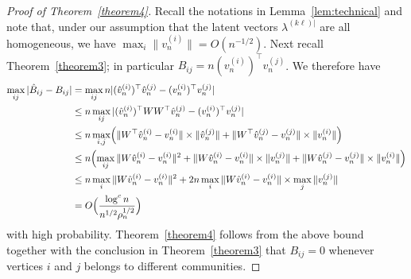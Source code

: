 \documentclass[12pt]{article}
\begin{document}
\begin{proof}[Proof of Theorem~\ref{theorem4}]
  Recall the notations in Lemma~\ref{lem:technical} and note that,
  under our assumption that the latent vectors $\lambda^{(k \ell)|}$
  are all homogeneous, we have $\max_{i} \|v_n^{(i)}\| =
  O(n^{-1/2})$. 
Next recall Theorem~\ref{theorem3}; in particular $B_{ij} = n(v_n^{(i)})^{\top}
v_n^{(j)}$. %
We therefore have
\[\begin{split}
 \max_{ij} |\hat{B}_{ij} - B_{ij}| &= \max_{ij} n |(\hat{v}_n^{(i)})^\top \hat{v}_n^{(j)} -
(v_n^{(i)})^\top v_n^{(j)}| \\
& \leq n \max_{ij} |(\hat{v}_n^{(i)})^\top W W^\top \hat{v}_n^{(j)} -
(v_n^{(i)})^\top v_n^{(j)}| \\
& \leq n \max_{i,j} \Bigl(\|W^{\top} \hat{v}_n^{(i)} - v_n^{(i)}\| \times \|\hat{v}_n^{(j)}\|
+ \|W^{\top} \hat{v}_n^{(j)} - v_n^{(j)}\| \times \|v_n^{(i)}\|\Bigr) \\
& \leq n \Bigl(\max_{ij}  \|W \hat{v}_n^{(i)}  - v_n^{(i)} \|^2 +  \|W
\hat{v}_n^{(i)}  - v_n^{(i)} \| \times \|v_n^{(j)}\| +  \|W \hat{v}_n^{(j)}  - v_n^{(j)} \| \times \|v_n^{(i)}\|\Bigr) 
\\ &
\leq n \max_{i} \|W \hat{v}_n^{(i)}  - v_n^{(i)} \|^2 + 2n \max_{i}
\|W \hat{v}_n^{(i)}  - v_n^{(i)} \| \times \max_{j} \|v_n^{(j)}\|
\\
& = O \Big( \frac{\log^{c}{n}}{n^{1/2} \rho_n^{1/2}} \Big)
\end{split}\]
with high probability.
Theorem~\ref{theorem4} follows from the above bound together with the
conclusion in Theorem~\ref{theorem3} that $B_{ij} = 0$ whenever vertices $i$ and $j$
belongs to different communities. 
\end{proof}
\end{document}
